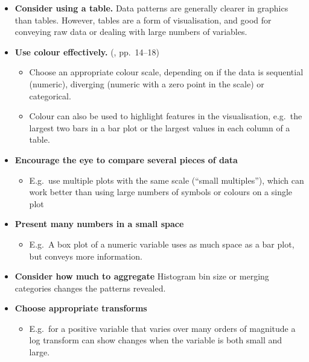 \documentclass[10pt]{article}
\begin{document}
\begin{multicols}{3}
{\begin{itemize}[itemsep=1ex]
\begin{itemize}
  \item E.g.~In a scatter plot (two numeric variables), the colour and
    shape of each marker can represent two categorical variables, thus
    displaying four variables. Size can represent ordinal variables.
  \item But assess whether the plot is too complex to read.
  \end{itemize}
\item \textbf{Consider using a table.} Data patterns are generally
  clearer in graphics than tables. However, tables are a form of
  visualisation, and good for conveying raw data or dealing with large
  numbers of variables.
\item \textbf{Use colour effectively.} (\citealp{WexlEtal17big}, pp.~14--18)
  \begin{itemize}
  \item Choose an appropriate colour scale, depending on if the data
    is sequential (numeric), diverging (numeric with a zero point in
    the scale) or categorical.
  \item Colour can also be used to highlight features in the visualisation,
    e.g.~the largest two bars in a bar plot or the largest values in
    each column of a table.
  \end{itemize}
\item \textbf{Encourage the eye to compare several pieces of data}
  \begin{itemize}
  \item E.g.~use multiple plots with the same scale (``small
    multiples''), which can work better than using large numbers of
    symbols or colours on a single plot
  \end{itemize}
\item \textbf{Present many numbers in a small space}
  \begin{itemize}
  \item E.g.~A box plot of a numeric variable uses as much space as a
    bar plot, but conveys more information.
  \end{itemize}
\item \textbf{Consider how much to aggregate} Histogram bin size or
  merging categories changes the patterns revealed.
\item \textbf{Choose appropriate transforms}
  \begin{itemize}
  \item E.g.~for a positive variable that varies over many orders of
    magnitude %
    a log transform can show changes when the variable is both small
    and large.
  \end{itemize}
\end{itemize}
}


\end{multicols}
\end{document}
